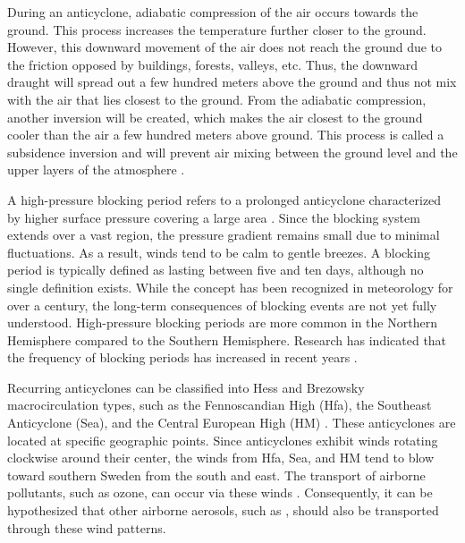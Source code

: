 During an anticyclone, adiabatic compression of the air occurs towards the ground. This process increases the temperature further closer to the ground. However, this downward movement of the air does not reach the ground due to the friction opposed by buildings, forests, valleys, etc. Thus, the downward draught will spread out a few hundred meters above the ground and thus not mix with the air that lies closest to the ground. From the adiabatic compression, another inversion will be created, which makes the air closest to the ground cooler than the air a few hundred meters above ground. This process is called a subsidence inversion and will prevent air mixing between the ground level and the upper layers of the atmosphere \cite{gramschInfluenceSurfaceSubsidence2014}.

A high-pressure blocking period refers to a prolonged anticyclone characterized by higher surface pressure covering a large area \cite{lupoAtmosphericBlockingEvents2020}. Since the blocking system extends over a vast region, the pressure gradient remains small due to minimal fluctuations. As a result, winds tend to be calm to gentle breezes. A blocking period is typically defined as lasting between five and ten days, although no single definition exists. While the concept has been recognized in meteorology for over a century, the long-term consequences of blocking events are not yet fully understood. High-pressure blocking periods are more common in the Northern Hemisphere compared to the Southern Hemisphere. Research has indicated that the frequency of blocking periods has increased in recent years \cite{lupoAtmosphericBlockingEvents2020}. 

Recurring anticyclones can be classified into Hess and Brezowsky macrocirculation types, such as the Fennoscandian High (Hfa), the Southeast Anticyclone (Sea), and the Central European High (HM) \cite{bartholyEuropeanCycloneTrack2006}. These anticyclones are located at specific geographic points. Since anticyclones exhibit winds rotating clockwise around their center, the winds from Hfa, Sea, and HM tend to blow toward southern Sweden from the south and east. The transport of airborne pollutants, such as ozone, can occur via these winds \cite{oteroImpactAtmosphericBlocking2022}. Consequently, it can be hypothesized that other airborne aerosols, such as \PM, should also be transported through these wind patterns.

